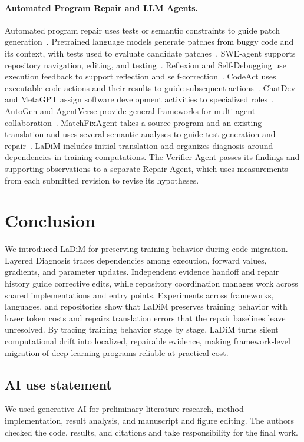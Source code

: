 \documentclass{article}
\begin{document}
\paragraph{Automated Program Repair and LLM Agents.}
Automated program repair uses tests or semantic constraints to guide patch generation~\citep{nguyen2013semfix}. Pretrained language models generate patches from buggy code and its context, with tests used to evaluate candidate patches~\citep{xia2023aprplm}. SWE-agent supports repository navigation, editing, and testing~\citep{yang2024sweagent}. Reflexion and Self-Debugging use execution feedback to support reflection and self-correction~\citep{shinn2023reflexion,chen2023selfdebugging}. CodeAct uses executable code actions and their results to guide subsequent actions~\citep{wang2024codeact}. ChatDev and MetaGPT assign software development activities to specialized roles~\citep{qian2023chatdev,hong2023metagpt}. AutoGen and AgentVerse provide general frameworks for multi-agent collaboration~\citep{wu2023autogen,chen2023agentverse}. MatchFixAgent takes a source program and an existing translation and uses several semantic analyses to guide test generation and repair~\citep{ibrahimzada2025matchfixagent}. LaDiM includes initial translation and organizes diagnosis around dependencies in training computations. The Verifier Agent passes its findings and supporting observations to a separate Repair Agent, which uses measurements from each submitted revision to revise its hypotheses.



\section{Conclusion}
We introduced LaDiM for preserving training behavior during code migration. Layered Diagnosis traces dependencies among execution, forward values, gradients, and parameter updates. Independent evidence handoff and repair history guide corrective edits, while repository coordination manages work across shared implementations and entry points. Experiments across frameworks, languages, and repositories show that LaDiM preserves training behavior with lower token costs and repairs translation errors that the repair baselines leave unresolved. By tracing training behavior stage by stage, LaDiM turns silent computational drift into localized, repairable evidence, making framework-level migration of deep learning programs reliable at practical cost.


\subsection*{AI use statement}
We used generative AI for preliminary literature research, method implementation, result analysis, and manuscript and figure editing. The authors checked the code, results, and citations and take responsibility for the final work.
\end{document}
